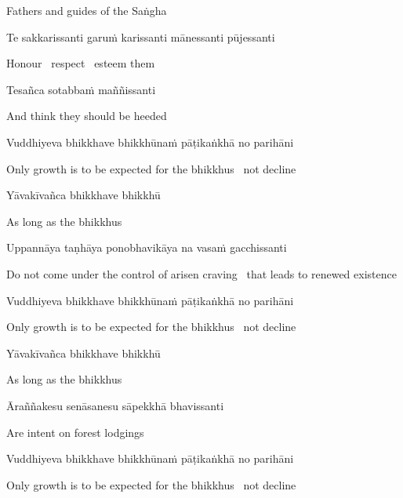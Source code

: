 \begin{english}
  Fathers and guides of the Saṅgha
\end{english}

Te sakkarissanti garuṁ karissanti mānessanti pūjessanti

\begin{english}
  Honour \breathmark\ respect \breathmark\ esteem them
\end{english}

Tesañca sotabbaṁ maññissanti

\begin{english}
  And think they should be heeded
\end{english}

Vuddhiyeva bhikkhave bhikkhūnaṁ pāṭikaṅkhā no parihāni

\begin{english}
  Only growth is to be expected for the bhikkhus \breathmark\ not decline
\end{english}

Yāvakīvañca bhikkhave bhikkhū

\begin{english}
  As long as the bhikkhus
\end{english}

Uppannāya taṇhāya ponobhavikāya na vasaṁ gacchissanti

\begin{english-hang}
  Do not come under the control of arisen craving \breathmark\ that leads to renewed existence
\end{english-hang}

Vuddhiyeva bhikkhave bhikkhūnaṁ pāṭikaṅkhā no parihāni

\begin{english}
  Only growth is to be expected for the bhikkhus \breathmark\ not decline
\end{english}

Yāvakīvañca bhikkhave bhikkhū

\begin{english}
  As long as the bhikkhus
\end{english}

Āraññakesu senāsanesu sāpekkhā bhavissanti

\begin{english}
  Are intent on forest lodgings
\end{english}

Vuddhiyeva bhikkhave bhikkhūnaṁ pāṭikaṅkhā no parihāni

\begin{english}
  Only growth is to be expected for the bhikkhus \breathmark\ not decline
\end{english}

